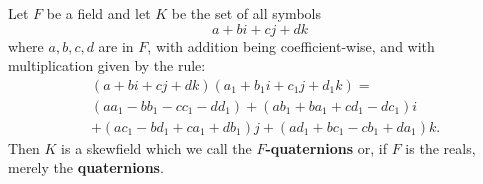 Let $F$ be a field and let $K$ be the set of all symbols
$$a + bi + cj + dk$$
where $a,b,c,d$ are in $F$, with addition being coefficient-wise, and with multiplication given by the rule:
\begin{align*}
&\left( a + bi + cj + dk \right) \left( a_1 + b_1 i + c_1 j + d_1 k \right) = \\
&\left( aa_1 - bb_1 - cc_1 - dd_1 \right) + \left( ab_1 + ba_1 + cd_1 - dc_1 \right) i \\
&+ \left( ac_1 - bd_1 + ca_1 + db_1 \right) j + \left( ad_1 + bc_1 - cb_1 + da_1 \right) k.
\end{align*}
Then $K$ is a skewfield which we call the \textbf{$F$-quaternions} or, if $F$ is the reals, merely the \textbf{quaternions}.
